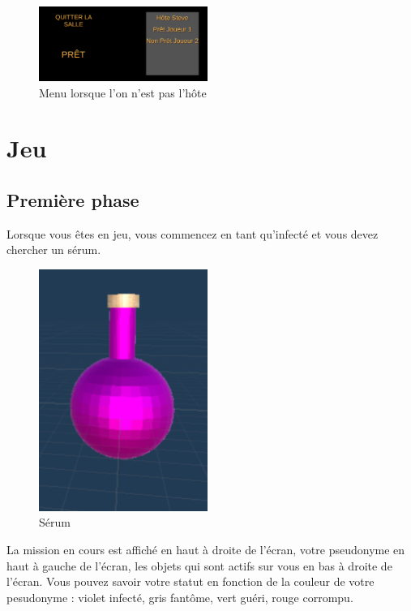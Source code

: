 \documentclass{article}
\begin{document}
\begin{figure}[H]
	\centering
	\includegraphics[width=0.49\textwidth]{Menu32.png}
	\caption{Menu lorsque l'on n'est pas l'hôte}
	\label{Menu lorsque l'on n'est pas l'hôte}
\end{figure}

\newpage
\section{Jeu}
\subsection{Première phase}

Lorsque vous êtes en jeu, vous commencez en tant qu'infecté et vous devez chercher un sérum.

\begin{figure}[H]
	\centering
	\includegraphics[width=0.49\textwidth]{Fioles.png}
	\caption{Sérum}
	\label{Sérum}
\end{figure}

La mission en cours est affiché en haut à droite de l'écran, votre pseudonyme en haut à gauche de l'écran, les objets qui sont actifs sur vous en bas à droite de l'écran. Vous pouvez savoir votre statut en fonction de la couleur de votre pesudonyme : violet infecté, gris fantôme, vert guéri, rouge corrompu. 
\end{document}
